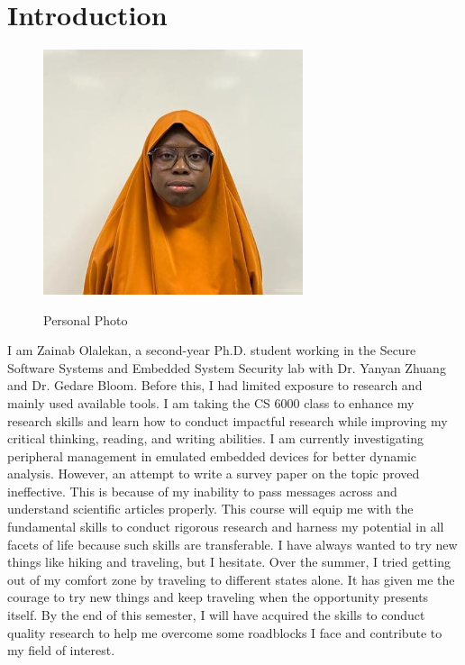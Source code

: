

% 


\section{Introduction}  \label{sec-introduction}


\begin{figure}[h]
    \begin{center}
        \centering
    \includegraphics[width=3in]{Olalekan.jpg}
    \caption{Personal Photo}
    \centering
    \label{fig:figure1}
    \end{center}    
\end{figure}

I am Zainab Olalekan, a second-year Ph.D. student working in the Secure Software Systems and Embedded System Security lab with Dr. Yanyan Zhuang and Dr. Gedare Bloom. Before this, I had limited exposure to research and mainly used available tools. I am taking the CS 6000 class to enhance my research skills and learn how to conduct impactful research while improving my critical thinking, reading, and writing abilities. I am currently investigating peripheral management in emulated embedded devices for better dynamic analysis. However, an attempt to write a survey paper on the topic proved ineffective. This is because of my inability to pass messages across and understand scientific articles properly. This course will equip me with the fundamental skills to conduct rigorous research and harness my potential in all facets of life because such skills are transferable. I have always wanted to try new things like hiking and traveling, but I hesitate. Over the summer, I tried getting out of my comfort zone by traveling to different states alone. It has given me the courage to try new things and keep traveling when the opportunity presents itself. By the end of this semester, I will have acquired the skills to conduct quality research to help me overcome some roadblocks I face and contribute to my field of interest.

